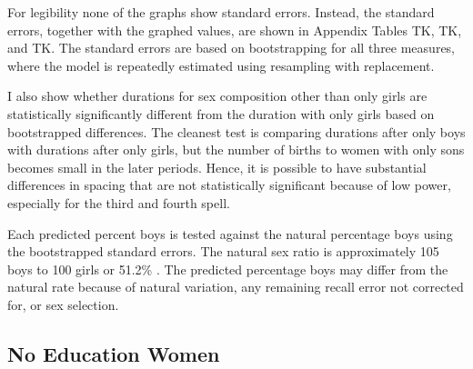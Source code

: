 \documentclass[12pt,letterpaper]{article}
\begin{document}
For legibility none of the graphs show standard errors.
Instead, the standard errors, together with the graphed values, are shown in Appendix 
Tables TK, TK, and TK.
The standard errors are based on bootstrapping for all three measures,
where the model is repeatedly estimated using resampling with replacement.

I also show whether durations for sex composition other than only girls are statistically 
significantly different from the duration with only girls based on bootstrapped 
differences. 
The cleanest test is comparing durations after only boys with durations after
only girls, but the number of births to women with only sons becomes small 
in the later periods.
Hence, it is possible to have substantial differences in spacing that are
not statistically significant because of low power, especially for the third 
and fourth spell.

Each predicted percent boys is tested against the natural percentage 
boys using the bootstrapped standard errors.
The natural sex ratio is approximately 105 boys to 100 girls or
51.2\% \citep{ben-porath76b,jacobsen99,Portner2015b}.
The predicted percentage boys may differ from the natural rate because of 
natural variation, any remaining recall error not corrected for, or 
sex selection. 

\subsection{No Education Women}


\captionsetup[subfigure]{captionskip=-1pt,farskip=-0.5pt}
\end{document}
